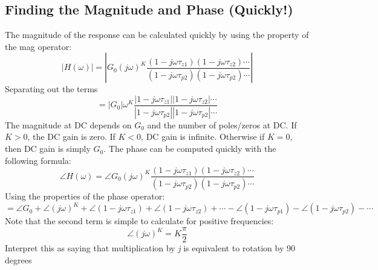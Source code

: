 \subsection{Finding the Magnitude and Phase (Quickly!)}
The magnitude of the response can be calculated quickly by using the property of the mag operator:
    \begin{equation}
        \left| {H(\omega )} \right| =
            \left| {{G_0}{{(j\omega )}^K} \frac{{(1 - j\omega {\tau _{z1}})(1 - j\omega {\tau _{z2}}) \cdots }}{{(1 - j\omega {\tau _{p2}})(1 - j\omega {\tau _{p2}}) \cdots }}} \right|
    \end{equation}
Separating out the terms
    \begin{equation}
        = \left| {{G_0}} \right|{\omega ^K} \frac{{\left| {1 - j\omega {\tau _{z1}}} \right|\left| {1 - j\omega {\tau _{z2}}} \right| \cdots }} {{\left| {1 - j\omega {\tau _{p2}}} \right|\left| {1 - j\omega {\tau _{p2}}} \right| \cdots}}
    \end{equation}
The magnitude at DC depends on $G_0$  and the number of poles/zeros at DC. If $K > 0$,  the DC gain is zero. If $K < 0$, DC gain is infinite. Otherwise if $K = 0$, then DC gain is simply $G_0$.
The phase can be computed quickly with the following formula:
    \begin{equation}
        \angle H(\omega ) = \angle {G_0}{(j\omega )^K}\frac{{(1 - j\omega {\tau _{z1}})(1 - j\omega {\tau _{z2}}) \cdots }}{{(1 - j\omega {\tau _{p2}})(1 - j\omega {\tau _{p2}}) \cdots }}
    \end{equation}
Using the properties of the phase operator:
    \begin{equation}
        = \angle {G_0} + \angle {(j\omega )^K} + \angle (1 - j\omega {\tau _{z1}}) + \angle (1 - j\omega {\tau _{z2}}) + \cdots - \angle (1 - j\omega {\tau _{p1}}) - \angle (1 - j\omega {\tau _{p2}}) - \cdots
    \end{equation}
Note that the second term is simple to calculate for positive frequencies:
    \begin{equation}
        \angle {(j\omega )^K} = K\frac{\pi}{2}
    \end{equation}
Interpret this as saying that multiplication by \textit{j} is equivalent to rotation by 90 degrees
